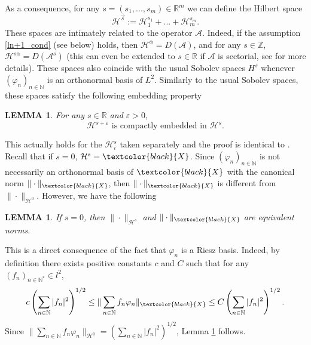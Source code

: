 \documentclass[11pt, dvipsnames]{amsart}
\newtheorem{lem}[theorem]{LEMMA}
\begin{document}
As a consequence, for any $s=(s_{1},...,s_{m})\in\mathbb{R}^{m}$ we can define the Hilbert space
\begin{equation*}
    \mathcal{H}^{\vec s}:=\mathcal{H}_1^{s_1}+ ... +\mathcal{H}_m^{s_m}.
\end{equation*}
These spaces are intimately related to the operator $\mathcal{A}$. Indeed, if the assumption \ref{ln+1_cond} (see below) holds, then $\mathcal{H}^{\alpha} = D(\mathcal{A})$, and for any $s\in\mathbb{Z}$, $\mathcal{H}^{s\alpha} = D(\mathcal{A}^{s})$ (this can even be extended to $s\in\mathbb{R}$ if $\mathcal{A}$ is sectorial, see \cite[Section 2.6]{PazyBook} for more details). These spaces also coincide with the usual Sobolev spaces $H^{s}$ whenever $(\varphi_{n})_{n\in\mathbb{N}}$ is an orthonormal basis of $L^{2}$. Similarly to the usual Sobolev spaces, these spaces satisfy the following embedding property
\begin{lem}
\label{lem:embedding}
    For any $s\in\mathbb{R}$ and $\varepsilon>0$,
    \begin{equation*}
    \mathcal{H}^{s+\varepsilon}\text{ is compactly embedded in }\mathcal{H}^{s}.
    \end{equation*}
\end{lem}
This actually holds for the $\mathcal{H}^{s}_{i}$ taken separately and the proof is identical to \cite[Section 1.8.1]{Gagnon2022-fredholm}.
 Recall that if $s=0$, $\mathcal{H}^{s} = \textcolor{black}{X}$. Since $(\varphi_{n})_{n\in\mathbb{N}}$ is not necessarily an orthonormal basis of $\textcolor{black}{X}$ with the canonical norm $\|\cdot\|_{\textcolor{black}{X}}$, then $\|\cdot\|_{\textcolor{black}{X}}$ is different from $\|\cdot\|_{\mathcal{H}^{0}}$. However, we have the following
\begin{lem}
\label{lem:equivnorm}
    If $s=0$, then $\|\cdot \|_{\mathcal{H}^{s}}$ and $\|\cdot\|_{\textcolor{black}{X}}$ are equivalent norms.
\end{lem}
This is a direct consequence of the fact that $\varphi_{n}$ is a Riesz basis. Indeed, by definition there exists positive constants $c$ and $C$ such that for any $(f_{n})_{n\in\mathbb{N}^{*}}\in l^{2}$,
\begin{equation}
c\left(\sum\limits_{n\in\mathbb{N}}|f_{n}|^{2}\right)^{1/2}\leq \|\sum\limits_{n\in\mathbb{N}}f_{n}\varphi_{n}\|_{\textcolor{black}{X}}\leq C\left(\sum\limits_{n\in\mathbb{N}}|f_{n}|^{2}\right)^{1/2}.
\end{equation}
Since  $\|\sum\limits_{n\in\mathbb{N}}f_{n}\varphi_{n}\|_{\mathcal{H}^{0}}=(\sum\limits_{n\in\mathbb{N}}|f_{n}|^{2})^{1/2}$, Lemma \ref{lem:equivnorm} follows.
\\
\end{document}
